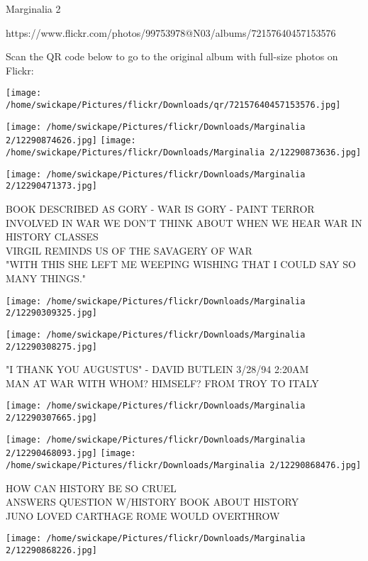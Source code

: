 \documentclass[10pt,letterpaper]{article}
\begin{document}
Marginalia 2

https://www.flickr.com/photos/99753978@N03/albums/72157640457153576

Scan the QR code below to go to the original album with full-size photos on Flickr:

\texttt{[image: /home/swickape/Pictures/flickr/Downloads/qr/72157640457153576.jpg]}
\pagebreak

\texttt{[image: /home/swickape/Pictures/flickr/Downloads/Marginalia 2/12290874626.jpg]}
\texttt{[image: /home/swickape/Pictures/flickr/Downloads/Marginalia 2/12290873636.jpg]}

\vspace{0.25in}
\texttt{[image: /home/swickape/Pictures/flickr/Downloads/Marginalia 2/12290471373.jpg]}

BOOK DESCRIBED AS GORY {-} WAR IS GORY {-} PAINT TERROR INVOLVED IN WAR WE DON'T THINK ABOUT WHEN WE HEAR WAR IN HISTORY CLASSES\\
VIRGIL REMINDS US OF THE SAVAGERY OF WAR\\
"WITH THIS SHE LEFT ME WEEPING WISHING THAT I COULD SAY SO MANY THINGS."
\pagebreak

\texttt{[image: /home/swickape/Pictures/flickr/Downloads/Marginalia 2/12290309325.jpg]}

\vspace{0.25in}
\texttt{[image: /home/swickape/Pictures/flickr/Downloads/Marginalia 2/12290308275.jpg]}

"I THANK YOU AUGUSTUS" {-} DAVID BUTLEIN 3/28/94 2:20AM\\
MAN AT WAR WITH WHOM? HIMSELF? FROM TROY TO ITALY
\pagebreak

\texttt{[image: /home/swickape/Pictures/flickr/Downloads/Marginalia 2/12290307665.jpg]}

\vspace{0.25in}
\texttt{[image: /home/swickape/Pictures/flickr/Downloads/Marginalia 2/12290468093.jpg]}
\texttt{[image: /home/swickape/Pictures/flickr/Downloads/Marginalia 2/12290868476.jpg]}

HOW CAN HISTORY BE SO CRUEL\\
ANSWERS QUESTION W/HISTORY BOOK ABOUT HISTORY\\
JUNO LOVED CARTHAGE ROME WOULD OVERTHROW
\pagebreak

\texttt{[image: /home/swickape/Pictures/flickr/Downloads/Marginalia 2/12290868226.jpg]}
\end{document}
